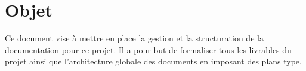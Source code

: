 \section{Objet}

Ce document vise à mettre en place la gestion et la structuration de la 
documentation pour ce projet.
Il a pour but de formaliser tous les livrables du projet ainsi que 
l'architecture globale des documents en imposant des plans type.
